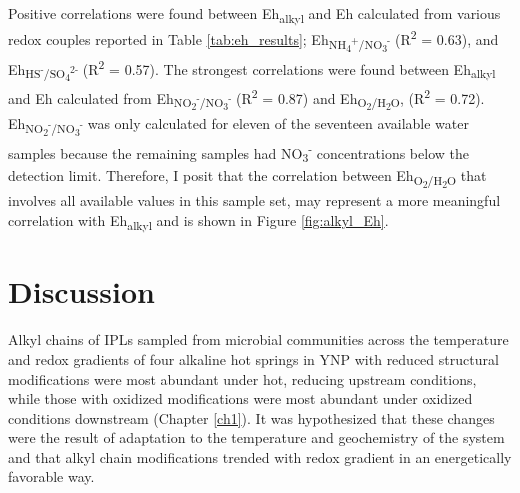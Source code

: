 Positive correlations were found between Eh\textsubscript{alkyl} and Eh calculated from various redox couples reported in Table \ref{tab:eh_results}; Eh\textsubscript{NH\textsubscript{4}\textsuperscript{+}/NO\textsubscript{3}\textsuperscript{-}} (R\textsuperscript{2} = 0.63), and Eh\textsubscript{HS\textsuperscript{-}/SO\textsubscript{4}\textsuperscript{2-}} (R\textsuperscript{2} = 0.57). The strongest correlations were found between Eh\textsubscript{alkyl} and Eh calculated from Eh\textsubscript{NO\textsubscript{2}\textsuperscript{-}/NO\textsubscript{3}\textsuperscript{-}} (R\textsuperscript{2} = 0.87) and Eh\textsubscript{O\textsubscript{2}/H\textsubscript{2}O}, (R\textsuperscript{2} = 0.72). Eh\textsubscript{NO\textsubscript{2}\textsuperscript{-}/NO\textsubscript{3}\textsuperscript{-}} was only calculated for eleven of the seventeen available water samples because the remaining samples had NO\textsubscript{3}\textsuperscript{-} concentrations below the detection limit. Therefore, I posit that the correlation between Eh\textsubscript{O\textsubscript{2}/H\textsubscript{2}O} that involves all available values in this sample set, may represent a more meaningful correlation with Eh\textsubscript{alkyl} and is shown in Figure \ref{fig:alkyl_Eh}.

\section{Discussion}

Alkyl chains of IPLs sampled from microbial communities across the temperature and redox gradients of four alkaline hot springs in YNP with reduced structural modifications were most abundant under hot, reducing upstream conditions, while those with oxidized modifications were most abundant under oxidized conditions downstream (Chapter \ref{ch1}). It was hypothesized that these changes were the result of adaptation to the temperature and geochemistry of the system and that alkyl chain modifications trended with redox gradient in an energetically favorable way.


